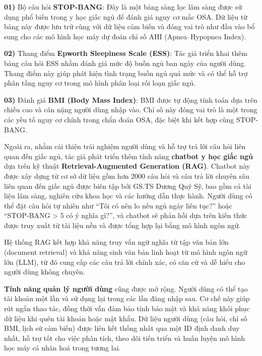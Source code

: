 \noindent\textbf{01)} Bộ câu hỏi \textbf{STOP-BANG}: Đây là một bảng sàng lọc lâm sàng được sử dụng phổ biến trong y học giấc ngủ để đánh giá nguy cơ mắc OSA. Dữ liệu từ bảng này được lưu trữ cùng với dữ liệu cảm biến và đóng vai trò như đầu vào bổ sung cho các mô hình học máy dự đoán chỉ số AHI (Apnea–Hypopnea Index).

\vspace{0.5em}
\noindent\textbf{02)} Thang điểm \textbf{Epworth Sleepiness Scale (ESS)}: Tác giả triển khai thêm bảng câu hỏi ESS nhằm đánh giá mức độ buồn ngủ ban ngày của người dùng. Thang điểm này giúp phát hiện tình trạng buồn ngủ quá mức và có thể hỗ trợ phân tầng nguy cơ trong mô hình phân loại rối loạn giấc ngủ.

\vspace{0.5em}
\noindent\textbf{03)} Đánh giá \textbf{BMI (Body Mass Index)}: BMI được tự động tính toán dựa trên chiều cao và cân nặng người dùng nhập vào. Chỉ số này đóng vai trò là một trong các yếu tố nguy cơ chính trong chẩn đoán OSA, đặc biệt khi kết hợp cùng STOP-BANG.


Ngoài ra, nhằm cải thiện trải nghiệm người dùng và hỗ trợ trả lời câu hỏi liên quan 
đến giấc ngủ, tác giả 
phát triển thêm tính năng \textbf{chatbot y học giấc ngủ} dựa trên kỹ thuật 
\textbf{Retrieval-Augmented Generation (RAG)}. Chatbot này được xây dựng từ cơ 
sở dữ liệu gồm hơn 2000 câu hỏi và 
câu trả lời chuyên sâu liên quan đến giấc ngủ được biên tập bởi GS.TS Dương Quý Sỹ, 
bao gồm cả tài liệu lâm sàng, nghiên cứu khoa học và các hướng dẫn thực hành. 
Người dùng có thể đặt câu hỏi tự nhiên như “Tôi có nên lo nếu ngủ ngáy liên tục?” 
hoặc “STOP-BANG > 5 có ý nghĩa gì?”, và chatbot sẽ phản hồi dựa trên kiến 
thức được truy xuất từ tài liệu nền và được tổng hợp lại bằng mô hình ngôn ngữ.

Hệ thống RAG kết hợp khả năng truy vấn ngữ nghĩa từ tập văn bản lớn 
(document retrieval) và khả năng sinh văn bản linh hoạt từ mô hình ngôn ngữ lớn 
(LLM), từ đó cung cấp các câu trả lời chính xác, có căn cứ và dễ hiểu cho 
người dùng không chuyên.

\textbf{Tính năng quản lý người dùng} cũng được mở rộng. Người dùng có thể 
tạo tài khoản một lần và sử dụng lại trong các lần đăng nhập sau. Cơ chế này 
giúp rút ngắn thao tác, đồng thời vẫn đảm bảo tính bảo mật và khả năng khôi 
phục dữ liệu khi quên tài khoản hoặc mật khẩu. Dữ liệu người dùng 
(câu hỏi, chỉ số BMI, lịch sử cảm biến) được liên kết thống nhất qua một 
ID định danh duy nhất, hỗ trợ tốt cho việc phân tích, theo dõi tiến triển 
và huấn luyện mô hình học máy cá nhân hoá trong tương lai.



